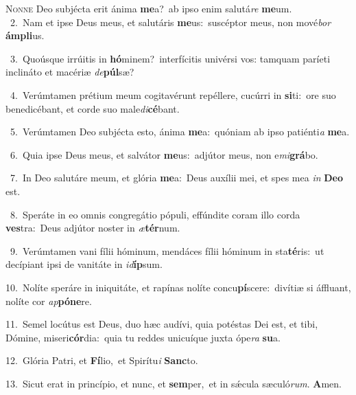 \lettrine{\initial\textcolor{\initialcolor}{N}}{onne} Deo subjécta erit ánima \textbf{me}\-a?~\star ab ipso enim salutá\textit{re} \textbf{me}\-um.\\
{\numbfont\textcolor{\numbcolor}{~2.}}~Nam et ipse Deus meus, et salutáris \textbf{me}\-us:~\star suscéptor meus, non mové\textit{bor} \textbf{ám}\-\textbf{pli}us.\par
{\numbfont\textcolor{\numbcolor}{~3.}}~Quoúsque irrúitis in \textbf{hó}\-minem?~\star interfícitis univérsi vos: tamquam paríeti inclináto et macériæ \textit{de}\-\textbf{púl}sæ?\par
{\numbfont\textcolor{\numbcolor}{~4.}}~Verúmtamen prétium meum cogitavérunt repéllere, cucúrri in \textbf{si}\-ti:~\star ore suo benedicébant, et corde suo male\-\textit{di}\-\textbf{cé}bant.\par
{\numbfont\textcolor{\numbcolor}{~5.}}~Verúmtamen Deo subjécta esto, ánima \textbf{me}\-a:~\star quóniam ab ipso patiénti\textit{a} \textbf{me}\-a.\par
{\numbfont\textcolor{\numbcolor}{~6.}}~Quia ipse Deus meus, et salvátor \textbf{me}\-us:~\star adjútor meus, non e\-\textit{mi}\-\textbf{grá}bo.\par
{\numbfont\textcolor{\numbcolor}{~7.}}~In Deo salutáre meum, et glória \textbf{me}\-a:~\star Deus auxílii mei, et spes mea \textit{in} \textbf{De}\-\textbf{o} est.\par
{\numbfont\textcolor{\numbcolor}{~8.}}~Speráte in eo omnis congregátio pópuli, effúndite coram illo corda \textbf{ves}\-tra:~\star Deus adjútor noster in \textit{æ}\-\textbf{tér}num.\par
{\numbfont\textcolor{\numbcolor}{~9.}}~Verúmtamen vani fílii hóminum, mendáces fílii hóminum in sta\-\textbf{té}\-ris:~\star ut decípiant ipsi de vanitáte in \textit{id}\-\textbf{íp}sum.\par
{\numbfont\textcolor{\numbcolor}{10.}}~Nolíte speráre in iniquitáte, et rapínas nolíte concu\-\textbf{pí}\-scere:~\star divítiæ si áffluant, nolíte cor \textit{ap}\-\textbf{pó}\textbf{ne}re.\par
{\numbfont\textcolor{\numbcolor}{11.}}~Semel locútus est Deus, duo hæc audívi, quia potéstas Dei est, et tibi, Dómine, miseri\-\textbf{cór}\-dia:~\star quia tu reddes unicuíque juxta ópe\textit{ra} \textbf{su}\-a.\par
{\numbfont\textcolor{\numbcolor}{12.}}~Glória Patri, et \textbf{Fí}\-lio,~\star et Spirítu\textit{i} \textbf{Sanc}\-to.\par
{\numbfont\textcolor{\numbcolor}{13.}}~Sicut erat in princípio, et nunc, et \textbf{sem}\-per,~\star et in sǽcula sæculó\-\textit{rum}\-. \textbf{A}\-men.\par
